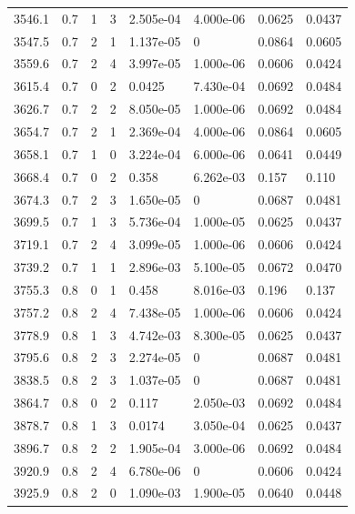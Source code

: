 \documentclass[preview]{standalone}
\begin{document}
{{{{{{\begin{tabular}{L{1.2cm}C{1.2cm} C{0.3cm}C{0.5cm} C{1.4cm}C{1.4cm} C{1.4cm}C{1.4cm}}
  3546.1  &   0.7  & 1     &  3 &  2.505e-04  & 4.000e-06  & 0.0625 &  0.0437   \\ 
  3547.5  &   0.7  & 2     &  1 &  1.137e-05  & 0  & 0.0864 &  0.0605   \\ 
  3559.6  &   0.7  & 2     &  4 &  3.997e-05  & 1.000e-06  & 0.0606 &  0.0424   \\ 
  3615.4  &   0.7  & 0     &  2 &  0.0425  & 7.430e-04  & 0.0692 &  0.0484   \\ 
  3626.7  &   0.7  & 2     &  2 &  8.050e-05  & 1.000e-06  & 0.0692 &  0.0484   \\ 
  3654.7  &   0.7  & 2     &  1 &  2.369e-04  & 4.000e-06  & 0.0864 &  0.0605   \\ 
  3658.1  &   0.7  & 1     &  0 &  3.224e-04  & 6.000e-06  & 0.0641 &  0.0449   \\ 
  3668.4  &   0.7  & 0     &  2 &  0.358  & 6.262e-03  & 0.157 &  0.110   \\ 
  3674.3  &   0.7  & 2     &  3 &  1.650e-05  & 0  & 0.0687 &  0.0481   \\ 
  3699.5  &   0.7  & 1     &  3 &  5.736e-04  & 1.000e-05  & 0.0625 &  0.0437   \\ 
  3719.1  &   0.7  & 2     &  4 &  3.099e-05  & 1.000e-06  & 0.0606 &  0.0424   \\ 
  3739.2  &   0.7  & 1     &  1 &  2.896e-03  & 5.100e-05  & 0.0672 &  0.0470   \\ 
  3755.3  &   0.8  & 0     &  1 &  0.458  & 8.016e-03  & 0.196 &  0.137   \\ 
  3757.2  &   0.8  & 2     &  4 &  7.438e-05  & 1.000e-06  & 0.0606 &  0.0424   \\ 
  3778.9  &   0.8  & 1     &  3 &  4.742e-03  & 8.300e-05  & 0.0625 &  0.0437   \\ 
  3795.6  &   0.8  & 2     &  3 &  2.274e-05  & 0  & 0.0687 &  0.0481   \\ 
  3838.5  &   0.8  & 2     &  3 &  1.037e-05  & 0  & 0.0687 &  0.0481   \\ 
  3864.7  &   0.8  & 0     &  2 &  0.117  & 2.050e-03  & 0.0692 &  0.0484   \\ 
  3878.7  &   0.8  & 1     &  3 &  0.0174  & 3.050e-04  & 0.0625 &  0.0437   \\ 
  3896.7  &   0.8  & 2     &  2 &  1.905e-04  & 3.000e-06  & 0.0692 &  0.0484   \\ 
  3920.9  &   0.8  & 2     &  4 &  6.780e-06  & 0  & 0.0606 &  0.0424   \\ 
  3925.9  &   0.8  & 2     &  0 &  1.090e-03  & 1.900e-05  & 0.0640 &  0.0448   \\ 

\end{tabular}}}}}}}
\end{document}
